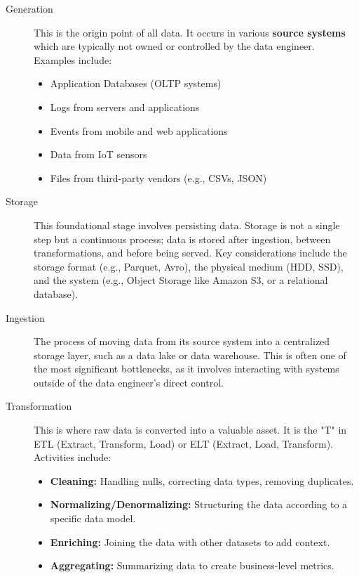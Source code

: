 \documentclass{article}
\begin{document}

\begin{description}
    \item[Generation] This is the origin point of all data. It occurs in various \textbf{source systems} which are typically not owned or controlled by the data engineer. Examples include:
    \begin{itemize}
        \item Application Databases (OLTP systems)
        \item Logs from servers and applications
        \item Events from mobile and web applications
        \item Data from IoT sensors
        \item Files from third-party vendors (e.g., CSVs, JSON)
    \end{itemize}

    \item[Storage] This foundational stage involves persisting data. Storage is not a single step but a continuous process; data is stored after ingestion, between transformations, and before being served. Key considerations include the storage format (e.g., Parquet, Avro), the physical medium (HDD, SSD), and the system (e.g., Object Storage like Amazon S3, or a relational database).

    \item[Ingestion] The process of moving data from its source system into a centralized storage layer, such as a data lake or data warehouse. This is often one of the most significant bottlenecks, as it involves interacting with systems outside of the data engineer's direct control.

    \item[Transformation] This is where raw data is converted into a valuable asset. It is the "T" in ETL (Extract, Transform, Load) or ELT (Extract, Load, Transform). Activities include:
    \begin{itemize}
        \item \textbf{Cleaning:} Handling nulls, correcting data types, removing duplicates.
        \item \textbf{Normalizing/Denormalizing:} Structuring the data according to a specific data model.
        \item \textbf{Enriching:} Joining the data with other datasets to add context.
        \item \textbf{Aggregating:} Summarizing data to create business-level metrics.
    \end{itemize}


\end{description}
\end{document}
